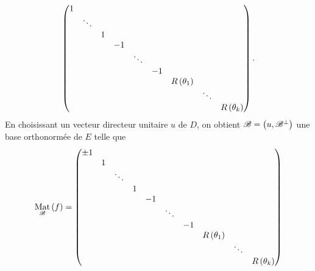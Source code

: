 \begin{dem}
\begin{itemize}
\begin{itemize}
\[\begin{pmatrix}
            1 &        &   &    &        &    &                   &        &  \\
              & \ddots &   &    &        &    &                   &        &  \\
              &        & 1 &    &        &    &                   &        &  \\
              &        &   & -1 &        &    &                   &        &  \\
              &        &   &    & \ddots &    &                   &        &  \\
              &        &   &    &        & -1 &                   &        &  \\
              &        &   &    &        &    & R\left(\theta_1\right) &        &  \\
              &        &   &    &        &    &                   & \ddots &  \\
              &        &   &    &        &    &                   &        & R\left(\theta_k\right)
        \end{pmatrix}.\] En choisissant un vecteur directeur unitaire \(u\) de \(D\), on obtient \(\mathscr{B}=\left(u,\mathscr{B}^{\perp}\right)\) une base orthonormée de \(E\) telle que \[\Mat{f}=\begin{pmatrix}
            \pm1 &   &        &   &    &        &    &                   &        &       \\
                 & 1 &        &   &    &        &    &                   &        &  \\
                 &   & \ddots &   &    &        &    &                   &        &  \\
                 &   &        & 1 &    &        &    &                   &        &  \\
                 &   &        &   & -1 &        &    &                   &        &  \\
                 &   &        &   &    & \ddots &    &                   &        &  \\
                 &   &        &   &    &        & -1 &                   &        &  \\
                 &   &        &   &    &        &    & R\paren{\theta_1} &        &  \\
                 &   &        &   &    &        &    &                   & \ddots &  \\
                 &   &        &   &    &        &    &                   &        & R\paren{\theta_k}

\end{pmatrix}\]
\end{itemize}
\end{itemize}
\end{dem}
